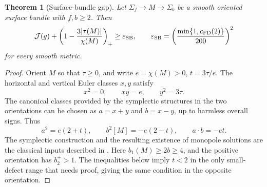 \documentclass[11pt,a4paper]{article}
\newtheorem{theorem}{Theorem}[section]
\theoremstyle{definition}
\theoremstyle{remark}
\newcommand{\J}{\mathcal J}
\begin{document}
\begin{theorem}[Surface-bundle gap]\label{thm:SB}
Let $\Sigma_f\to M\to\Sigma_b$ be a smooth oriented surface bundle with $f,b\ge2$. Then
\begin{equation}
 \J(g)+\left(1-\frac{3|\tau(M)|}{\chi(M)}\right)_+
 \ge\varepsilon_{\rm SB},\qquad
 \varepsilon_{\rm SB}=\left(\frac{\min\{1,c_{\rm FD}(2)\}}{200}\right)^2
 \label{eq:SB}
\end{equation}
for every smooth metric.
\end{theorem}
\begin{proof}
Orient $M$ so that $\tau\ge0$, and write $e=\chi(M)>0$, $t=3\tau/e$. The horizontal and vertical Euler classes $x,y$ satisfy
\[
 x^2=0,\qquad xy=e,\qquad y^2=3\tau.
\]
The canonical classes provided by the symplectic structures in the two orientations can be chosen as $a=x+y$ and $b=x-y$, up to harmless overall signs. Thus
\begin{equation}
 a^2=e(2+t),\qquad b^2[M]=-e(2-t),\qquad a\cdot b=-et.
 \label{eq:bundleclasses}
\end{equation}
The symplectic construction and the resulting existence of monopole solutions are the classical inputs described in \cite{Kotschick1999,TwoOrientation}. Here $b_1(M)\ge2b\ge4$, and the positive orientation has $b_2^+>1$. The inequalities below imply $t<2$ in the only small-defect range that needs proof, giving the same condition in the opposite orientation.


\end{proof}
\end{document}
